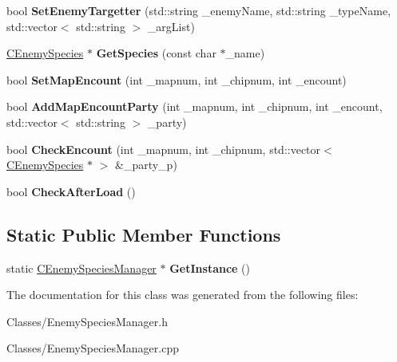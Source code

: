 \begin{DoxyCompactItemize}
\item 
bool {\bfseries Set\+Enemy\+Targetter} (std\+::string \+\_\+enemy\+Name, std\+::string \+\_\+type\+Name, std\+::vector$<$ std\+::string $>$ \+\_\+arg\+List)\hypertarget{class_c_enemy_species_manager_a797a72318055c9ae74acba4feb86cbfb}{}\label{class_c_enemy_species_manager_a797a72318055c9ae74acba4feb86cbfb}

\item 
\hyperlink{class_c_enemy_species}{C\+Enemy\+Species} $\ast$ {\bfseries Get\+Species} (const char $\ast$\+\_\+name)\hypertarget{class_c_enemy_species_manager_af0a736cc0fdb58408b900667871ae5c1}{}\label{class_c_enemy_species_manager_af0a736cc0fdb58408b900667871ae5c1}

\item 
bool {\bfseries Set\+Map\+Encount} (int \+\_\+mapnum, int \+\_\+chipnum, int \+\_\+encount)\hypertarget{class_c_enemy_species_manager_a01147031a924bdf6ed939829b7e69084}{}\label{class_c_enemy_species_manager_a01147031a924bdf6ed939829b7e69084}

\item 
bool {\bfseries Add\+Map\+Encount\+Party} (int \+\_\+mapnum, int \+\_\+chipnum, int \+\_\+encount, std\+::vector$<$ std\+::string $>$ \+\_\+party)\hypertarget{class_c_enemy_species_manager_aeda3ed33dc2cda2139c9642e78be6488}{}\label{class_c_enemy_species_manager_aeda3ed33dc2cda2139c9642e78be6488}

\item 
bool {\bfseries Check\+Encount} (int \+\_\+mapnum, int \+\_\+chipnum, std\+::vector$<$ \hyperlink{class_c_enemy_species}{C\+Enemy\+Species} $\ast$ $>$ \&\+\_\+party\+\_\+p)\hypertarget{class_c_enemy_species_manager_aa81ecf36891b968c3723b3e635b97059}{}\label{class_c_enemy_species_manager_aa81ecf36891b968c3723b3e635b97059}

\item 
bool {\bfseries Check\+After\+Load} ()\hypertarget{class_c_enemy_species_manager_a1a5a8d5c7486a3e25736283c13bbe5c7}{}\label{class_c_enemy_species_manager_a1a5a8d5c7486a3e25736283c13bbe5c7}

\end{DoxyCompactItemize}
\subsection*{Static Public Member Functions}
\begin{DoxyCompactItemize}
\item 
static \hyperlink{class_c_enemy_species_manager}{C\+Enemy\+Species\+Manager} $\ast$ {\bfseries Get\+Instance} ()\hypertarget{class_c_enemy_species_manager_a0b12e5c3c55fdd368aed2d475a7f9a47}{}\label{class_c_enemy_species_manager_a0b12e5c3c55fdd368aed2d475a7f9a47}

\end{DoxyCompactItemize}


The documentation for this class was generated from the following files\+:\begin{DoxyCompactItemize}
\item 
Classes/Enemy\+Species\+Manager.\+h\item 
Classes/Enemy\+Species\+Manager.\+cpp\end{DoxyCompactItemize}
